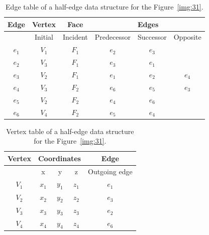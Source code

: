 \begin{table}[]\centering
    \begin{tabular}{|c|c|c|ccc|}
    \hline
    \hline
    Edge  & Vertex       & Face        & \multicolumn{3}{c|}{Edges}                            \\ \hline
          & Initial      & Incident    & Predecessor            & Successor          & Opposite         \\ \hline\hline
    $e_1$ & $V_1$        & $F_1$       & $e_2$            & $e_3$           &                  \\ \hline
    $e_2$ & $V_3$        & $F_1$       & $e_3$            & $e_1$           &                  \\ \hline
    $e_3$ & $V_2$        & $F_1$       & $e_1$            & $e_2$           & $e_4$            \\ \hline
    $e_4$ & $V_3$        & $F_2$       & $e_6$            & $e_5$           & $e_3$            \\ \hline
    $e_5$ & $V_2$        & $F_2$       & $e_4$            & $e_6$           &                  \\ \hline
    $e_6$ & $V_4$        & $F_2$       & $e_5$            & $e_4$           &                  \\ \hline\hline
    
    \end{tabular}
\caption{Edge table of a half-edge data structure for the Figure~\ref{img:31}.}
\label{tab:5}
\end{table}

\begin{table}[]
    \centering
    \begin{tabular}{|c|ccc|c|}
    \hline
    \hline
    Vertex  & \multicolumn{3}{c|}{Coordinates}          & Edge            \\ \hline
          & x            & y            & z           & Outgoing edge   \\ \hline\hline
    $V_1$ & $x_1$        & $y_1$        & $z_1$       & $e_1$           \\ \hline
    $V_2$ & $x_2$        & $y_2$        & $z_2$       & $e_3$           \\ \hline
    $V_3$ & $x_3$        & $y_3$        & $z_3$       & $e_2$           \\ \hline
    $V_4$ & $x_4$        & $y_4$        & $z_4$       & $e_6$           \\ \hline\hline
    \end{tabular}
\caption{Vertex table of a half-edge data structure for the Figure~\ref{img:31}.}
\label{tab:6}
\end{table}

